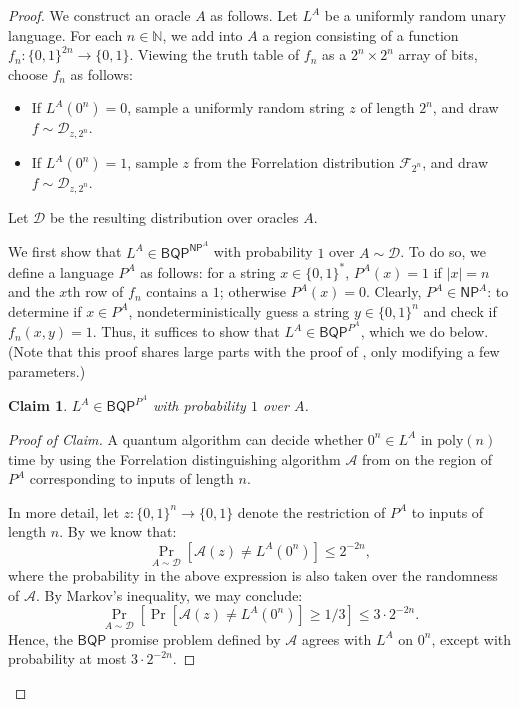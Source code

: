 \documentclass[10pt,a4paper]{article}
\newtheorem{claim}[theorem]{Claim}
\newcommand{\Naturals}{\mathbb{N}}
\newcommand{\poly}{\mathrm{poly}}
\begin{document}
\begin{proof}
We construct an oracle $A$ as follows. Let $L^A$ be a uniformly random unary language. For each $n \in \Naturals$, we add into $A$ a region consisting of a function $f_n: \{0,1\}^{2n} \to \{0,1\}$. Viewing the truth table of $f_n$ as a $2^{n} \times 2^{n}$ array of bits, choose $f_n$ as follows:
\begin{itemize}
\item If $L^A\left(0^n\right) = 0$, sample a uniformly random string $z$ of length $2^{n}$, and draw $f \sim \mathcal{D}_{z,2^{n}}$.
\item If $L^A\left(0^n\right) = 1$, sample $z$ from the Forrelation distribution $\mathcal{F}_{2^{n}}$, and draw $f \sim \mathcal{D}_{z,2^{n}}$.
\end{itemize}
Let $\mathcal{D}$ be the resulting distribution over oracles $A$.

We first show that $L^A \in \mathsf{BQP}^{\mathsf{NP}^A}$ with probability $1$ over $A \sim \mathcal{D}$. To do so, we define a language $P^A$ as follows: for a string $x \in \{0,1\}^*$, $P^A(x) = 1$ if $|x| = n$ and the $x$th row of $f_n$ contains a $1$; otherwise $P^A(x) = 0$. Clearly, $P^A \in \mathsf{NP}^A$: to determine if $x \in P^A$, nondeterministically guess a string $y \in \{0,1\}^{n}$ and check if $f_n(x, y) = 1$. Thus, it suffices to show that $L^A \in \mathsf{BQP}^{P^A}$, which we do below. (Note that this proof shares large parts with the proof of , only modifying a few parameters.)

\begin{claim}
\label{claim:l_in_bqp^p^a}
$L^A \in \mathsf{BQP}^{P^A}$ with probability $1$ over $A$.
\end{claim}

\begin{proof}[Proof of Claim]
A quantum algorithm can decide whether $0^{n} \in L^A$ in $\poly(n)$ time by using the Forrelation distinguishing algorithm $\mathcal{A}$ from  on the region of $P^A$ corresponding to inputs of length $n$.

In more detail, let $z: \{0,1\}^{n} \to \{0,1\}$ denote the restriction of $P^A$ to inputs of length $n$. By  we know that:
\[
\Pr_{A \sim \mathcal{D}} \left[\mathcal{A}(z) \neq L^A\left(0^{n}\right)\right] \le 2^{-2n},
\]
where the probability in the above expression is also taken over the randomness of $\mathcal{A}$. By Markov's inequality, we may conclude:
\[
\Pr_{A \sim \mathcal{D}} \left[\Pr\left[\mathcal{A}(z) \neq L^A\left(0^{n}\right)\right] \ge 1/3\right] \le 3 \cdot 2^{-2n}.
\]
Hence, the $\mathsf{BQP}$ promise problem defined by $\mathcal{A}$ agrees with $L^A$ on $0^{n}$, except with probability at most $3 \cdot 2^{-2n}$.


\end{proof}
\end{proof}
\end{document}
